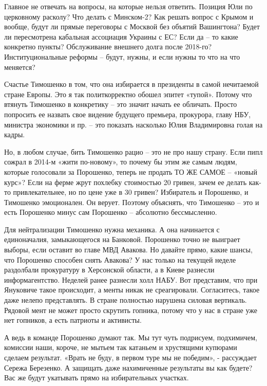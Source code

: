 Главное не отвечать на вопросы, на которые нельзя ответить. Позиция Юли по
церковному расколу? Что делать с Минском-2? Как решать вопрос с Крымом и
вообще, будут ли прямые переговоры с Москвой без объятий Вашингтона? Будет ли
пересмотрена кабальная ассоциация Украины с ЕС? Если да – то какие конкретно
пункты? Обслуживание внешнего долга после 2018-го? Институциональные реформы –
будут, нужны, и если нужны то что на что меняется?

Счастье Тимошенко в том, что она избирается в президенты в самой нечитаемой
стране Европы. Это я так политкорректно обошел эпитет «тупой». Потому что
втянуть Тимошенко в конкретику – это значит начать ее обличать. Просто
попросить ее назвать свое видение будущего премьера, прокурора, главу НБУ,
министра экономики и пр. – это показать насколько Юлия Владимировна голая на
кадры.

Но, в любом случае, бить Тимошенко рацио – это не про нашу страну. Если пипл
сожрал в 2014-м «жити по-новому», то почему бы этим же самым людям, которые
голосовали за Порошенко, теперь не продать ТО ЖЕ САМОЕ – «новый курс»? Если на
ферме жрут похлебку стоимостью 20 гривен, зачем ее делать как-то
привлекательнее, но по цене уже в 30 гривен? Избиратель и Порошенко, и
Тимошенко эмоционален. Он верует. Поэтому объяснять, что Тимошенко – это и есть
Порошенко минус сам Порошенко – абсолютно бессмысленно.

Для нейтрализации Тимошенко нужна механика. А она начинается с единоначалия,
замыкающегося на Банковой. Порошенко точно не выиграет выборы, если оставит во
главе МВД Авакова. Но давайте прямо, какие шансы, что Порошенко способен снять
Авакова? У нас только на текущей неделе раздолбали прокуратуру в Херсонской
области, а в Киеве разнесли информагентство. Неделей ранее разнесли холл НАБУ.
Вот представим, что при Януковиче такое происходит, а менты никак не
среагировали. Согласитесь, такое даже нелепо представлять. В стране полностью
нарушена силовая вертикаль. Рядовой мент не может просто скрутить гопника,
потому что у нас в стране уже нет гопников, а есть патриоты и активисты.

А ведь в команде Порошенко думают так. Мы тут чуть подрисуем, подхимичем,
комиссии наши, короче, не мытьем так катаньем и хрустящими купюрами сделаем
результат. «Врать не буду, в первом туре мы не победим», - рассуждает Сережа
Березенко. А защищать даже нахимиченные результаты вы как будете? Вас же будут
укатывать прямо на избирательных участках.


